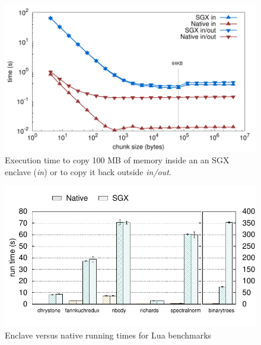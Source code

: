 \begin{figure}[t!]
  \centering
  \includegraphics[scale=0.45]{plots/memcpy/memcpy.pdf}
  \caption{Execution time to copy 100 MB of memory inside an an SGX enclave (\emph{in}) or to copy it back outside {\emph{in/out}.} }
  \label{fig:sgxmemcpy}
\end{figure}

\begin{figure}[t!]
  \centering
  \includegraphics[scale=0.65]{plots/microbenchmark_luasgx/microbenchmark_luasgx.pdf}
  \caption{Enclave versus native running times for Lua benchmarks}
  \label{fig:luabenchs}
\end{figure}

